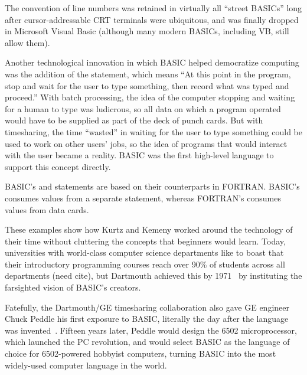   \begin{tangent}
  The convention of line numbers was retained in virtually all ``street
  BASICs'' long after cursor-addressable CRT terminals were ubiquitous,
  and was finally dropped in Microsoft Visual Basic (although many modern
  BASICs, including VB, still allow them).
  \end{tangent}

Another technological innovation in which BASIC helped democratize
computing was the addition of the 
statement, which means ``At this point in the program, stop and wait for
the user to type something, then record what was typed and proceed.''
With batch processing, the
idea of the computer stopping and waiting for a human to type was
ludicrous, so all data on which a program operated would have to be
supplied as part of the deck of punch cards.
But with timesharing, the time ``wasted'' in waiting for the user to
type something could be used to work on other users' jobs, so
the idea of programs that would interact with the
user became a reality.  BASIC was the first high-level language to
support this concept directly.

  \begin{tangent}
  BASIC's  and  statements are based on their
  counterparts in FORTRAN.  BASIC's  consumes values from a
  separate  statement, whereas FORTRAN's  consumes
  values from data cards.
  \end{tangent}

These examples show how Kurtz and Kemeny worked around the technology of their
time without cluttering the concepts that beginners would learn.
Today, universities with world-class computer science
departments like to boast that their introductory programming courses
reach over 90\% of
students across all departments (need cite), but
Dartmouth achieved this by 1971~\cite{man_and_computer} by instituting the farsighted 
vision of BASIC's creators.

Fatefully, the Dartmouth/GE timesharing collaboration also
gave GE engineer Chuck Peddle his first exposure to
BASIC, literally the day after the language was
invented~\cite[p.~5]{commodore}.
Fifteen years later, Peddle would design the 6502 microprocessor, which launched
the PC revolution, and would select BASIC as the language of choice for
6502-powered hobbyist computers, turning BASIC into the most
widely-used computer language in the world.



